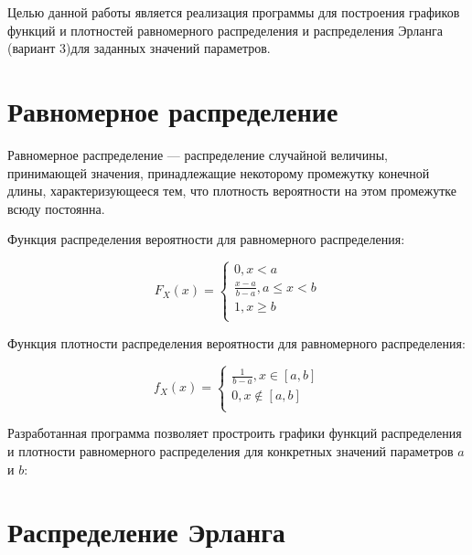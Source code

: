  Целью данной работы является реализация программы для построения графиков функций и плотностей равномерного распределения и распределения Эрланга (вариант 3)для заданных значений параметров. 

\section*{Равномерное распределение}
	
Равномерное распределение --- распределение случайной величины, принимающей значения, принадлежащие некоторому промежутку конечной длины, характеризующееся тем, что плотность вероятности на этом промежутке всюду постоянна.

Функция распределения вероятности для равномерного распределения:

\begin{equation*}
F_X (x) =
    \begin{cases}
        0, x < a \\
        \frac{x - a}{b - a}, a \le x < b \\
        1, x \geq b \\
    \end{cases}
\end{equation*}
	
Функция плотности распределения вероятности для равномерного распределения:

\begin{equation*}
    f_X (x) =
    \begin{cases}
        \frac{1}{b-a}, x \in [a,b] \\
        0, x \notin [a, b] \\
    \end{cases}
\end{equation*}



Разработанная программа позволяет простроить графики функций распределения и плотности равномерного распределения для конкретных значений параметров $a$ и $b$:


\section*{Распределение Эрланга}

